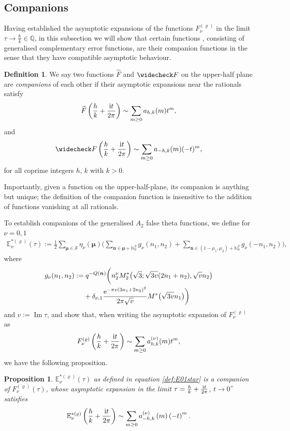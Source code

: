 \documentclass[10pt,a4paper]{amsart}
\def\BE{\mathbb{E}}
\def\CS{\mathcal{S}}
\newcommand{\QQ}{\mathbb{Q}}
\newcommand{\NN}{\mathbb{N}}
\def\bon{\mathbf{n}}
\def\bos{\varrho}
\def\bmu{\boldsymbol{\mu}}
\def\bon{\boldsymbol{n}}
\def\bosi{\bos}
\newtheorem{prop}[thm]{Proposition}
\theoremstyle{definition}
\newtheorem{defn}[thm]{Definition}
\numberwithin{equation}{section}
\begin{document}
\subsection{Companions}\label{subsec:companions}

Having established the asymptotic expansions of the functions $F_{\nu}^{( \bosi)}$ in the limit $\tau \to \frac{h}{k} \in \QQ$, in this subsection we will show that certain functions \smash{$\BE_\nu^{*(\bos)}(\tau)$}, consisting of generalised complementary error functions, are their companion functions in the sense that they have compatible asymptotic behaviour.

\begin{defn}\label{def:companions}
We say two functions $\widehat F$ and $\widecheck F$ on the upper-half plane are {\it companions} of each other if their asymptotic expansions near the rationals satisfy
\[
\widehat F\left(\frac{h}{k} +\frac{{\rm i}t}{2\pi}\right) \sim\sum_{m\geq 0} a_{h,k}(m) t^m,
\]
and
\[
\widecheck F\left(\frac{h}{k} +\frac{{\rm i}t}{2\pi}\right) \sim\sum_{m\geq 0} a_{-h,k}(m) (-t)^m,
\]
for all coprime integers $h$, $k$ with $k>0$.
\end{defn}
Importantly, given a function on the upper-half-plane, its companion is anything but unique; the definition of the companion function is insensitive to the addition of functions vanishing at all rationals.


To establish companions of the generalised $A_2$ false theta functions, we define for $\nu=0, 1$
\begin{gather}\label{def:E01star}
\BE_\nu^{*(\bos)}(\tau)
:= \frac{1}{2} \sum_{\bmu \in \CS}\eta_\nu(\bmu)\Biggl(\sum_{\bon \in \bmu + \NN_0^2} g_\nu(n_1,n_2)
+ \sum_{\bon \in (1-\mu_1,\mu_2) + \NN_0^2} g_\nu(-n_1,n_2) \Biggl),
\end{gather}
where
\begin{align}
 &g_\nu(n_1,n_2):= q^{-Q(\bon)} \bigg(n_2^\nu M_2^\ast \bigl( \sqrt{3} ; \sqrt{3v} (2n_1 + n_2), \sqrt{v}n_2\bigr)\nonumber\\
& \hphantom{g_\nu(n_1,n_2):=}{}
+ \delta_{\nu,1}\frac{ {\rm e}^{-\pi v (3n_1+2n_2)^2}}{2 \pi \sqrt{v}} M^\ast\bigl(\sqrt{3v} n_1\bigr) \bigg)\label{gnu}
\end{align}
and
$v:=\operatorname{Im}\tau$,
and show that, when writing the asymptotic expansion of $F_\nu^{(\bos)}$ as
\[
F_\nu^{(\bos)}\left(\frac{h}{k} +\frac{{\rm i}t}{2\pi}\right) \sim\sum_{m\geq 0} a_{h,k}^{(\nu)}(m) t^m,
\]
we have the following proposition.
\begin{prop}\label{prop:E01asymp}
	$\BE_{\nu}^{*(\bos)}\left( \tau \right)$ as defined in equation \eqref{def:E01star} is a companion of $F_\nu^{(\bosi)}(\tau)$, whose asymptotic expansion in the limit $\tau=\frac{h}{k}+\frac{{\rm i} t}{2\pi}$, $t\to 0^+$ satisfies
	\[
		\BE_{\nu}^{*(\bosi)}\left(\frac{h}{k}+\frac{{\rm i}t}{2\pi} \right)\sim
		\sum_{m\ge 0}a_{-h,k}^{(\nu)}\left( m \right)\left( -t \right)^{m}.
	\]
\end{prop}
\end{document}
